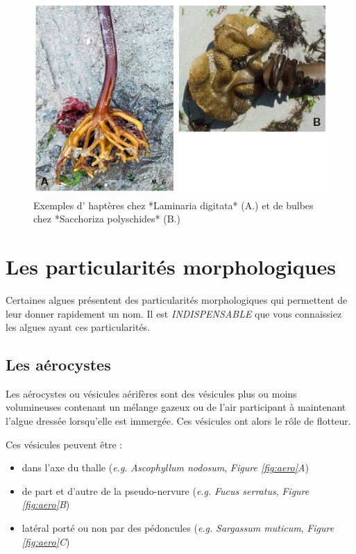 \documentclass[
]{book}
\begin{document}
\begin{figure}[H]

{\centering \includegraphics[width=0.7\linewidth]{./images/crampons} 

}

\caption{Exemples d' haptères chez *Laminaria digitata* (A.) et de bulbes chez *Sacchoriza polyschides* (B.)}\label{fig:crampon}
\end{figure}

\hypertarget{les-particularituxe9s-morphologiques}{%
\section{Les particularités morphologiques}\label{les-particularituxe9s-morphologiques}}

Certaines algues présentent des particularités morphologiques qui permettent de leur donner rapidement un nom. Il est \emph{INDISPENSABLE} que vous connaissiez les algues ayant ces particularités.

\hypertarget{les-auxe9rocystes}{%
\subsection{Les aérocystes}\label{les-auxe9rocystes}}

Les aérocystes ou vésicules aérifères sont des vésicules plus ou moins volumineuses contenant un mélange gazeux ou de l'air participant à maintenant l'algue dressée lorsqu'elle est immergée. Ces vésicules ont alors le rôle de flotteur.

Ces vésicules peuvent être :

\begin{itemize}
\item
  dans l'axe du thalle (\emph{e.g.} \emph{Ascophyllum nodosum}, \emph{Figure \ref{fig:aero}A})
\item
  de part et d'autre de la pseudo-nervure (\emph{e.g.} \emph{Fucus serratus}, \emph{Figure \ref{fig:aero}B})
\item
  latéral porté ou non par des pédoncules (\emph{e.g.} \emph{Sargassum muticum}, \emph{Figure \ref{fig:aero}C})
\end{itemize}
\end{document}
